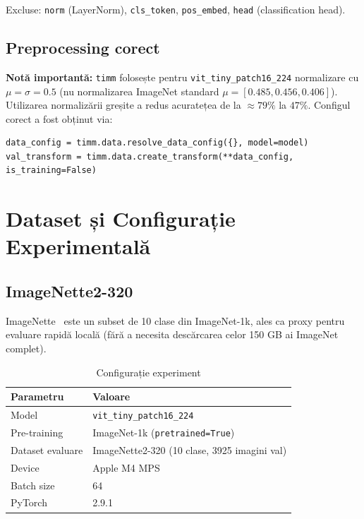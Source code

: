 \documentclass[12pt,a4paper]{article}
\begin{document}
Excluse: \texttt{norm} (LayerNorm), \texttt{cls\_token}, \texttt{pos\_embed},
\texttt{head} (classification head).

\subsection{Preprocessing corect}

\textbf{Notă importantă:} \texttt{timm} folosește pentru \texttt{vit\_tiny\_patch16\_224}
normalizare cu $\mu = \sigma = 0.5$ (nu normalizarea ImageNet standard
$\mu=[0.485, 0.456, 0.406]$). Utilizarea normalizării greșite a redus acuratețea de la
$\approx 79\%$ la $47\%$. Configul corect a fost obținut via:
\begin{verbatim}
data_config = timm.data.resolve_data_config({}, model=model)
val_transform = timm.data.create_transform(**data_config, is_training=False)
\end{verbatim}

\section{Dataset și Configurație Experimentală}

\subsection{ImageNette2-320}

ImageNette~\cite{imagenette} este un subset de 10 clase din ImageNet-1k, ales ca
proxy pentru evaluare rapidă locală (fără a necesita descărcarea celor 150 GB ai
ImageNet complet).

\begin{table}[H]
  \centering
  \caption{Configurație experiment}
  \begin{tabular}{ll}
    \toprule
    \textbf{Parametru} & \textbf{Valoare} \\
    \midrule
    Model               & \texttt{vit\_tiny\_patch16\_224} \\
    Pre-training        & ImageNet-1k (\texttt{pretrained=True}) \\
    Dataset evaluare    & ImageNette2-320 (10 clase, 3925 imagini val) \\
    Device              & Apple M4 MPS \\
    Batch size          & 64 \\
    PyTorch             & 2.9.1 \\
    \bottomrule
  \end{tabular}
  \label{tab:exp_config}
\end{table}
\end{document}
